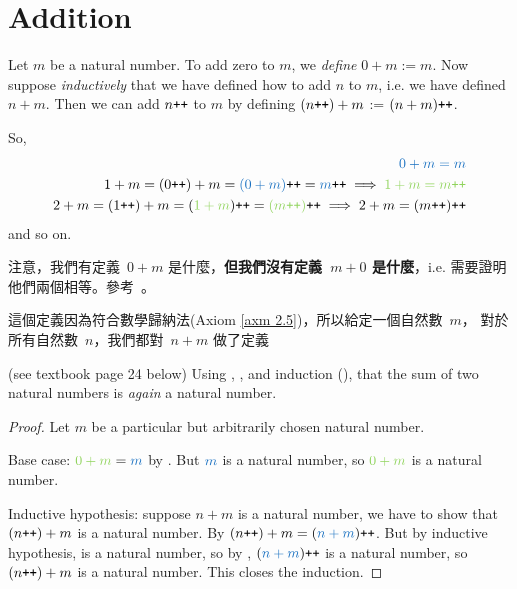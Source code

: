\section{Addition}\label{sec 2.2}

\begin{definition}  \label{def 2.2.1}
Let \(m\) be a natural number. To add zero to \(m\), we \emph{define} \(0 + m := m\).
Now suppose \emph{inductively} that we have defined how to add \(n\) to \(m\), i.e. we have defined \(n + m\).
Then we can add \(n\texttt{++} \) to \(m\) by defining \((n\texttt{++}) + m\) := \((n + m)\texttt{++}\).
\end{definition}
\begin{note}
So,
\begin{align*}
\BLUE{0 + m = m}\\
1 + m = (0\INC) + m = \BLUE{(0 + m)}\INC = \BLUE{m}\INC \implies \GREEN{1 + m = m\INC} \\
2 + m = (1\INC) + m = (\GREEN{1 + m})\INC = \GREEN{(m\INC)}\INC \implies 2 + m = (m\INC)\INC
\end{align*}
and so on.
\end{note}
\begin{note}
注意，我們有定義\ \(0 + m\) 是什麼，\textbf{但我們沒有定義\ \(m + 0\) 是什麼}，i.e. 需要證明他們兩個相等。參考\ 。
\end{note}
\begin{note}
這個定義因為符合數學歸納法(Axiom \ref{axm 2.5})，所以給定一個自然數\ \(m\)， 對於所有自然數\ \(n\)，我們都對\ \(n + m\) 做了定義
\end{note}

\begin{additional corollary}\label{ac 2.2.1} (see textbook page 24 below)
Using , , and induction (), that the sum of two natural numbers is \emph{again} a natural number.
\end{additional corollary}
\begin{proof}
Let \(m\) be a particular but arbitrarily chosen natural number.

Base case: \(\GREEN{0 + m} = \BLUE{m}\) by .
But \(\BLUE{m}\) is a natural number, so \(\GREEN{0 + m}\) is a natural number. 

Inductive hypothesis: suppose \(n + m\) is a natural number, we have to show that \((n\texttt{++}) + m\) is a natural number.
By  \((n\INC) + m = (\BLUE{n + m})\INC\). But by inductive hypothesis,  is a natural number, so by , \((\BLUE{n + m})\INC\) is a natural number, so \((n\texttt{++}) + m\) is a natural number. This closes the induction.
\end{proof}

